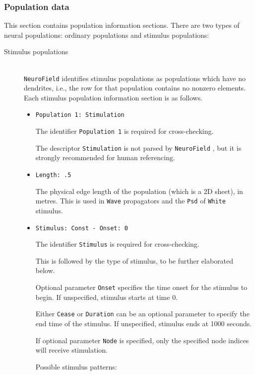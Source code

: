 \documentclass[12pt,a4paper]{article}
\newcommand{\type}[1]{{\small\small\tt #1} }
\newcommand{\NF}[0]{\type{NeuroField}}
\begin{document}
\subsubsection{Population data}
\label{sec:pop}
This section contains population information sections. There are two types of neural populations: ordinary populations and stimulus populations:
\begin{description}

\item[Stimulus populations]\ \\

\NF identifies stimulus populations as populations which have no dendrites, i.e., the row for that population contains no nonzero elements.  Each stimulus population information section is as follows.
\begin{itemize}
	\item \begin{lstlisting}
Population 1: Stimulation
	\end{lstlisting}
	The identifier \type{Population 1} is required for cross-checking.

	The descriptor \type{Stimulation} is not parsed by \NF, but it is strongly recommended for human referencing.
	\item
	\begin{lstlisting}
Length: .5
	\end{lstlisting}
	The physical edge length of the population (which is a 2D sheet), in metres. This is used in \type{Wave} propagators and the \type{Psd} of \type{White} stimulus.
	\item
	\begin{lstlisting}
Stimulus: Const - Onset: 0
	\end{lstlisting}
	The identifier \type{Stimulus} is required for cross-checking.

	This is followed by the type of stimulus, to be further elaborated below.

	Optional parameter \type{Onset} specifies the time onset for the stimulus to begin. If unspecified, stimulus starts at time 0.

	Either \type{Cease} or \type{Duration} can be an optional parameter to specify the end time of the stimulus. If unspecified, stimulus ends at 1000 seconds.

	If optional parameter \type{Node} is specified, only the specified node indices will receive stimulation.

	Possible stimulus patterns:


\end{itemize}
\end{description}
\end{document}
